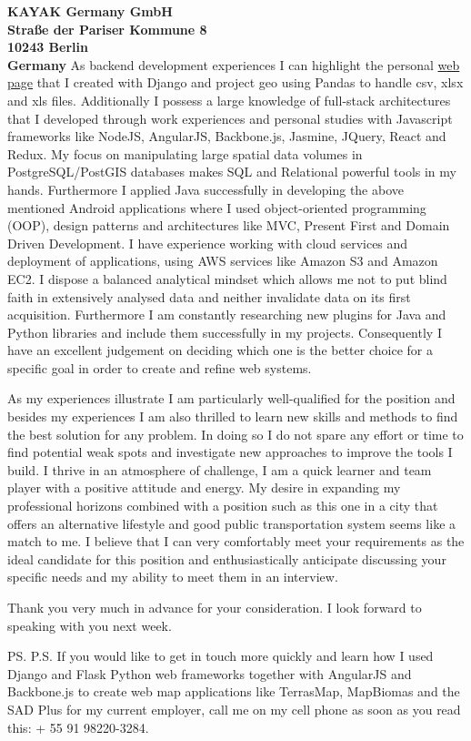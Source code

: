 \documentclass[a4paper]{joaosoares-letter}
\begin{document}
\begin{letter}{\bfseries KAYAK Germany GmbH\\Straße der Pariser Kommune 8\\10243 Berlin \\Germany}
As backend development experiences I can highlight the personal \href{https://goo.gl/wrN029}{web page} that I created with Django and project geo using Pandas to handle csv, xlsx and xls files. Additionally I possess a large knowledge of full-stack architectures that I developed through work experiences and personal studies with Javascript frameworks like NodeJS, AngularJS, Backbone.js, Jasmine, JQuery, React and Redux. My focus on manipulating large spatial data volumes in PostgreSQL/PostGIS databases makes SQL and Relational powerful tools in my hands. Furthermore I applied Java successfully in developing the above mentioned Android applications where I used object-oriented programming (OOP), design patterns and architectures like MVC, Present First and Domain Driven Development. I have experience working with cloud services and deployment of applications, using AWS services like Amazon S3 and Amazon EC2. I dispose a balanced analytical mindset which allows me not to put blind faith in extensively analysed data and neither invalidate data on its first acquisition. Furthermore I am constantly researching new plugins for Java and Python libraries and include them successfully in my projects. Consequently I have an excellent judgement on deciding which one is the better choice for a specific goal in order to create and refine web systems.

As my experiences illustrate I am particularly well-qualified for the position and besides my experiences I am also thrilled to learn new skills and methods to find the best solution for any problem. In doing so I do not spare any effort or time to find potential weak spots and investigate new approaches to improve the tools I build. I thrive in an atmosphere of challenge, I am a quick learner and team player with a positive attitude and energy. My desire in expanding my professional horizons combined with a position such as this one in a city that offers an alternative lifestyle and good public transportation system seems like a match to me. I believe that I can very comfortably meet your requirements as the ideal candidate for this position and enthusiastically anticipate discussing your specific needs and my ability to meet them in an interview.

\closing{Thank you very much in advance for your consideration. I look forward to speaking with you next week.}
\vspace{10pt}
\ps
P.S. If you would like to get in touch more quickly and learn how I used Django and Flask Python web frameworks together with AngularJS and Backbone.js to create web map applications like TerrasMap, MapBiomas and the SAD Plus for my current employer, call me on my cell phone as soon as you read this: + 55 91 98220-3284.
\vspace{\fill}

\end{letter}
\end{document}
